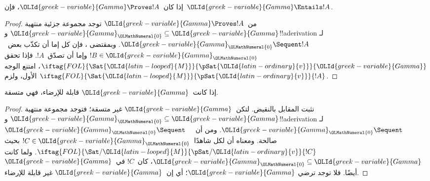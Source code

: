 \documentclass[../../../include/open-logic-section]{subfiles}
\begin{document}
\begin{cor}
إذا كان~${\OLId{greek-variable}{Gamma}} \Proves !A$، فإن~${\OLId{greek-variable}{Gamma}} \Entails !A$.
\end{cor}

\begin{proof}
من~${\OLId{greek-variable}{Gamma}} \Proves !A$ توجد مجموعة جزئية منتهية
${\OLId{greek-variable}{Gamma}}_{\OLMathNumeral{0}} \subseteq {\OLId{greek-variable}{Gamma}}$ و!!a{derivation} لـ
${\OLId{greek-variable}{Gamma}}_{\OLMathNumeral{0}} \Sequent !A$. وبمقتضى ، فإن كل
إما أن تكذّب بعض~$!B \in {\OLId{greek-variable}{Gamma}}_{\OLMathNumeral{0}}$ وإما أن تصدّق~$!A$.
فإذا تحقق
$\iftag{FOL}{\Sat{{\OLId{latin-looped}{M}}}}{\pSat{{\OLId{latin-ordinary}{v}}}}{{\OLId{greek-variable}{Gamma}}}$، امتنع الوجه الأول، ولزم
$\iftag{FOL}{\Sat{{\OLId{latin-looped}{M}}}}{\pSat{{\OLId{latin-ordinary}{v}}}}{!A}$.
\end{proof}

\begin{cor}
إذا كانت~${\OLId{greek-variable}{Gamma}}$ قابلة للإرضاء، فهي متسقة.
\end{cor}

\begin{proof}
نثبت المقابل بالنقيض. لتكن~${\OLId{greek-variable}{Gamma}}$ غير متسقة؛ فتوجد مجموعة منتهية
${\OLId{greek-variable}{Gamma}}_{\OLMathNumeral{0}} \subseteq {\OLId{greek-variable}{Gamma}}$ و!!a{derivation} لـ
${\OLId{greek-variable}{Gamma}}_{\OLMathNumeral{0}} \Sequent \quad$. ومن  أن
${\OLId{greek-variable}{Gamma}}_{\OLMathNumeral{0}} \Sequent \quad$ صالحة.
ومعناه أن لكل
شاهدًا~$!C \in {\OLId{greek-variable}{Gamma}}_{\OLMathNumeral{0}}$ بحيث
$\iftag{FOL}{\Sat/{{\OLId{latin-looped}{M}}}}{\pSat/{{\OLId{latin-ordinary}{v}}}}{!C}$.
ولما كانت ${\OLId{greek-variable}{Gamma}}_{\OLMathNumeral{0}} \subseteq {\OLId{greek-variable}{Gamma}}$، كان~$!C$ في~${\OLId{greek-variable}{Gamma}}$ أيضًا.
فلا توجد  ترضي
${\OLId{greek-variable}{Gamma}}$؛ أي إن~${\OLId{greek-variable}{Gamma}}$ غير قابلة للإرضاء.
\end{proof}
\end{document}
